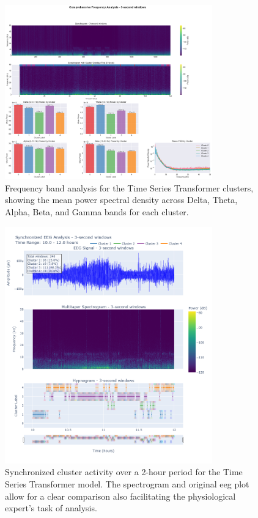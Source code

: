 \documentclass[a4paper,12pt,twoside]{article}
\begin{document}
\begin{figure}[H]
\centering
\includegraphics[width=0.8\textwidth]{img/tst frequency analysis.png}
\caption{Frequency band analysis for the Time Series Transformer clusters, showing the mean power spectral density across Delta, Theta, Alpha, Beta, and Gamma bands for each cluster.}
\label{fig:tst_frequency_analysis}
\end{figure}

\begin{figure}[H]
\centering
\includegraphics[width=0.8\textwidth]{img/tst synchronized plots 2h of sleep.png}
\caption{Synchronized cluster activity over a 2-hour period for the Time Series Transformer model. The spectrogram and original eeg plot allow for a clear comparison also facilitating the physiological expert's task of analysis.}
\label{fig:tst_synchronized_plots}
\end{figure}
\end{document}

